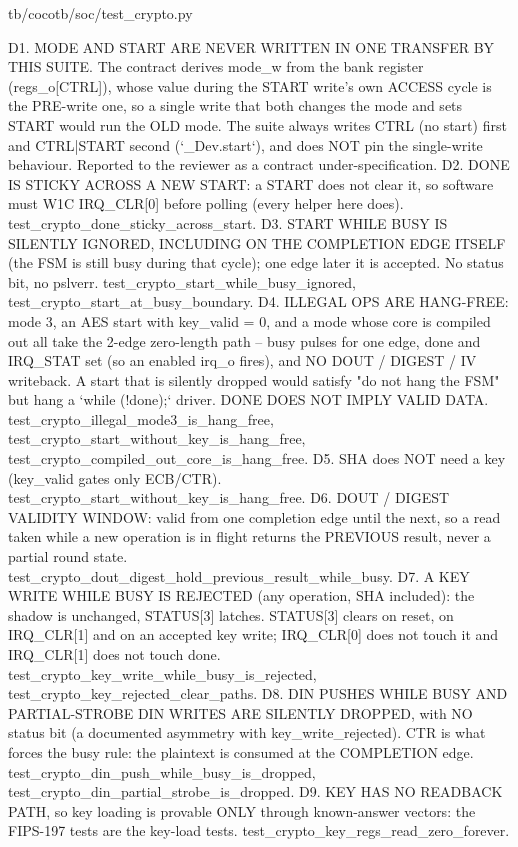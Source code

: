 \begin{relocated}{tb/cocotb/soc/test_crypto.py}
\begin{textblock}
D1. MODE AND START ARE NEVER WRITTEN IN ONE TRANSFER BY THIS SUITE.  The contract derives
mode_w from the bank register (regs_o[CTRL]), whose value during the START write's own
ACCESS cycle is the PRE-write one, so a single write that both changes the mode and sets
START would run the OLD mode.  The suite always writes CTRL (no start) first and CTRL|START
second (`_Dev.start`), and does NOT pin the single-write behaviour.  Reported to the
reviewer as a contract under-specification.
D2. DONE IS STICKY ACROSS A NEW START: a START does not clear it, so software must W1C
IRQ_CLR[0] before polling (every helper here does).  test_crypto_done_sticky_across_start.
D3. START WHILE BUSY IS SILENTLY IGNORED, INCLUDING ON THE COMPLETION EDGE ITSELF (the FSM is
still busy during that cycle); one edge later it is accepted.  No status bit, no pslverr.
test_crypto_start_while_busy_ignored, test_crypto_start_at_busy_boundary.
D4. ILLEGAL OPS ARE HANG-FREE: mode 3, an AES start with key_valid = 0, and a mode whose core is
compiled out all take the 2-edge zero-length path -- busy pulses for one edge, done and
IRQ_STAT set (so an enabled irq_o fires), and NO DOUT / DIGEST / IV writeback.  A start that
is silently dropped would satisfy "do not hang the FSM" but hang a `while (!done);` driver.
DONE DOES NOT IMPLY VALID DATA.  test_crypto_illegal_mode3_is_hang_free,
test_crypto_start_without_key_is_hang_free, test_crypto_compiled_out_core_is_hang_free.
D5. SHA does NOT need a key (key_valid gates only ECB/CTR).
test_crypto_start_without_key_is_hang_free.
D6. DOUT / DIGEST VALIDITY WINDOW: valid from one completion edge until the next, so a read
taken while a new operation is in flight returns the PREVIOUS result, never a partial round
state.  test_crypto_dout_digest_hold_previous_result_while_busy.
D7. A KEY WRITE WHILE BUSY IS REJECTED (any operation, SHA included): the shadow is unchanged,
STATUS[3] latches.  STATUS[3] clears on reset, on IRQ_CLR[1] and on an accepted key write;
IRQ_CLR[0] does not touch it and IRQ_CLR[1] does not touch done.
test_crypto_key_write_while_busy_is_rejected, test_crypto_key_rejected_clear_paths.
D8. DIN PUSHES WHILE BUSY AND PARTIAL-STROBE DIN WRITES ARE SILENTLY DROPPED, with NO status bit
(a documented asymmetry with key_write_rejected).  CTR is what forces the busy rule: the
plaintext is consumed at the COMPLETION edge.  test_crypto_din_push_while_busy_is_dropped,
test_crypto_din_partial_strobe_is_dropped.
D9. KEY HAS NO READBACK PATH, so key loading is provable ONLY through known-answer vectors:
the FIPS-197 tests are the key-load tests.  test_crypto_key_regs_read_zero_forever.

\end{textblock}
\end{relocated}
